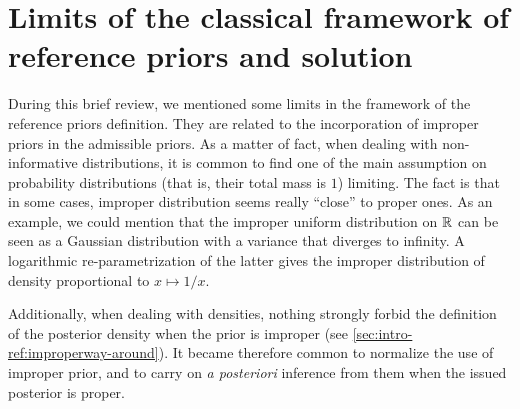 















\section{Limits of the classical framework of reference priors and solution}\label{sec:intro-refs:limits}



During this brief review, we mentioned some limits in the framework of the reference priors definition.
They are related to the incorporation of improper priors in the admissible priors. As a matter of fact, when dealing with non-informative distributions, it is common to find one of the main assumption on probability distributions (that is, their total mass is $1$) limiting.
The fact is that in some cases, improper distribution seems really ``close'' to proper ones.
As an example, we could mention that the improper uniform distribution on $\mathbb{R}$ can be seen as a Gaussian distribution with a variance that diverges to infinity. A logarithmic re-parametrization of the latter gives the improper distribution of density proportional to $x\mapsto1/x$.

Additionally, when dealing with densities, nothing strongly forbid the definition of the posterior density when the prior is improper (see \cref{sec:intro-ref:improperway-around}). It became therefore common to normalize the use of improper prior, and to carry on \emph{a posteriori} inference from them when the issued posterior is proper.

